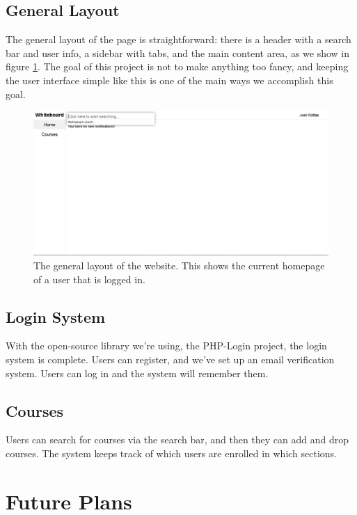 \documentclass{article}
\begin{document}
\subsection{General Layout}

The general layout of the page is straightforward: there is a header with a
search bar and user info, a sidebar with tabs, and the main content area, as we
show in figure \ref{fig:gl}. The goal of this project is not to make anything
too fancy, and keeping the user interface simple like this is one of the main
ways we accomplish this goal.

\begin{figure}
    \includegraphics[width=\linewidth]{general_layout}
    \caption{The general layout of the website. This shows the current homepage
    of a user that is logged in.}
    \label{fig:gl}
\end{figure}

\subsection{Login System}

With the open-source library we're using, the PHP-Login project, the
login system is complete. Users can register, and we've set up an email
verification system. Users can log in and the system will remember them.

\subsection{Courses}

Users can search for courses via the search bar, and then they can add and drop
courses. The system keeps track of which users are enrolled in which sections.

\section{Future Plans}
\end{document}
